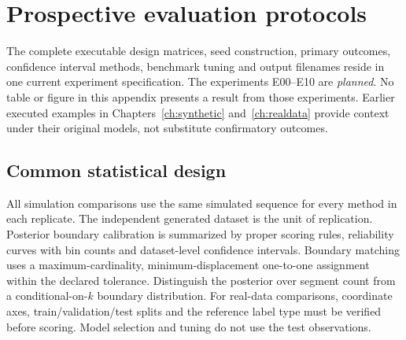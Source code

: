 \chapter{Prospective evaluation protocols}
\label{app:experiments}

The complete executable design matrices, seed construction, primary outcomes, confidence
interval methods, benchmark tuning and output filenames reside in one current experiment
specification. The experiments E00--E10 are \emph{planned}. No table or figure in this appendix
presents a result from those experiments. Earlier executed examples in
Chapters~\ref{ch:synthetic} and~\ref{ch:realdata} provide context under their original models,
not substitute confirmatory outcomes.

\section{Common statistical design}
All simulation comparisons use the same simulated sequence for every method in each replicate.
The independent generated dataset is the unit of replication. Posterior boundary calibration is
summarized by proper scoring rules, reliability curves with bin counts and dataset-level
confidence intervals. Boundary matching uses a maximum-cardinality, minimum-displacement
one-to-one assignment within the declared tolerance. Distinguish the posterior over segment
count from a conditional-on-$k$ boundary distribution. For real-data comparisons, coordinate
axes, train/validation/test splits and the reference label type must be verified before scoring.
Model selection and tuning do not use the test observations.

